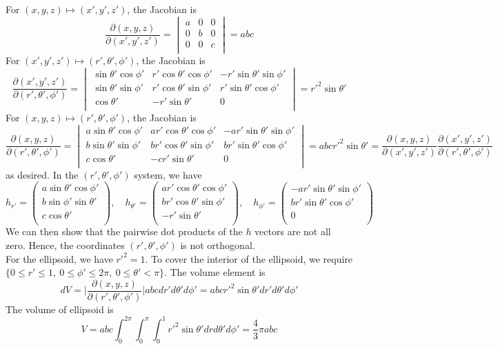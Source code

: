\documentclass[a4paper]{article}
\begin{document}
\begin{ans}
For $(x,y,z)\mapsto(x',y',z')$, the Jacobian is
$$\frac{\partial(x,y,z)}{\partial(x',y',z')}=\begin{vmatrix}a&0&0\\0&b&0\\0&0&c\\\end{vmatrix}=abc$$
For $(x',y',z')\mapsto(r',\theta',\phi')$, the Jacobian is
$$\frac{\partial(x',y',z')}{\partial(r',\theta',\phi')}=\begin{vmatrix}\sin\theta'\cos\phi'&r'\cos\theta'\cos\phi'&-r'\sin\theta'\sin\phi'\\\sin\theta'\sin\phi'&r'\cos\theta'\sin\phi'&r'\sin\theta'\cos\phi'\\\cos\theta'&-r'\sin\theta'&0\\\end{vmatrix}=r'^2\sin\theta'$$
For $(x,y,z)\mapsto(r',\theta',\phi')$, the Jacobian is
$$\frac{\partial(x,y,z)}{\partial(r',\theta',\phi')}=\begin{vmatrix}a\sin\theta'\cos\phi'&ar'\cos\theta'\cos\phi'&-ar'\sin\theta'\sin\phi'\\b\sin\theta'\sin\phi'&br'\cos\theta'\sin\phi'&br'\sin\theta'\cos\phi'\\c\cos\theta'&-cr'\sin\theta'&0\\\end{vmatrix}=abcr'^2\sin\theta'=\frac{\partial(x,y,z)}{\partial(x',y',z')}\frac{\partial(x',y',z')}{\partial(r',\theta',\phi')}$$
as desired.  In the $(r',\theta',\phi')$ system, we have
$$h_{r'}=\begin{pmatrix}a\sin\theta'\cos\phi'\\b\sin\phi'\sin\theta'\\c\cos\theta'\\\end{pmatrix},\quad h_{\theta'}=\begin{pmatrix}ar'\cos\theta'\cos\phi'\\br'\cos\theta'\sin\phi'\\-r'\sin\theta'\\\end{pmatrix},\quad h_{\phi'}=\begin{pmatrix}-ar'\sin\theta'\sin\phi'\\br'\sin\theta'\cos\phi'\\0\\\end{pmatrix}$$
We can then show that the pairwise dot products of the $h$ vectors are not all zero. Hence, the coordinates $(r',\theta',\phi')$ is not orthogonal.\\[5pt]
For the ellipsoid, we have $r'^2=1$. To cover the interior of the ellipsoid, we require $\{0\leq r'\leq 1, ~0\leq\phi'\leq2\pi,~0\leq \theta'<\pi\}$. The volume element is
$$dV=\bigg|\frac{\partial(x,y,z)}{\partial(r',\theta',\phi')}\bigg|abc dr'd\theta'd\phi'=abcr'^2\sin\theta'dr'd\theta'd\phi'$$
The volume of ellipsoid is 
$$V=abc\int_0^{2\pi}\int_0^\pi\int_0^1r'^2\sin\theta'drd\theta'd\phi'=\frac{4}{3}\pi abc$$
\end{ans}
\end{document}
